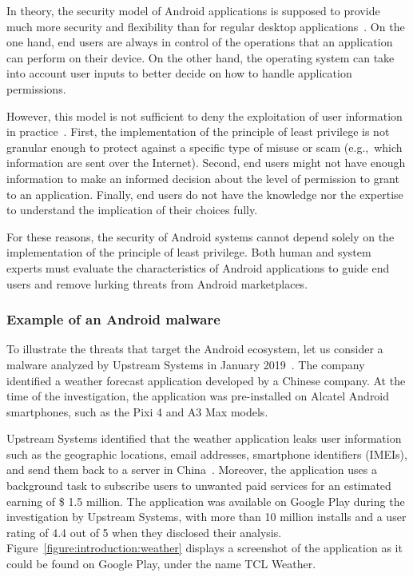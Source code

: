 In theory, the security model of Android applications is supposed to provide much more security and flexibility than for regular desktop applications~\cite{google_permissions_2019}.
On the one hand, end users are always in control of the operations that an application can perform on their device.
On the other hand, the operating system can take into account user inputs to better decide on how to handle application permissions.

However, this model is not sufficient to deny the exploitation of user information in practice~\cite{google_android_2018}.
First, the implementation of the principle of least privilege is not granular enough to protect against a specific type of misuse or scam (e.g.,\ which information are sent over the Internet).
Second, end users might not have enough information to make an informed decision about the level of permission to grant to an application.
Finally, end users do not have the knowledge nor the expertise to understand the implication of their choices fully.

For these reasons, the security of Android systems cannot depend solely on the implementation of the principle of least privilege.
Both human and system experts must evaluate the characteristics of Android applications to guide end users and remove lurking threats from Android marketplaces.
\subsubsection{Example of an Android malware}
To illustrate the threats that target the Android ecosystem, let us consider a malware analyzed by Upstream Systems in January 2019~\cite{upstream_systems_secure-d_2019}.
The company identified a weather forecast application developed by a Chinese company.
At the time of the investigation, the application was pre-installed on Alcatel Android smartphones, such as the Pixi 4 and A3 Max models.

Upstream Systems identified that the weather application leaks user information such as the geographic locations, email addresses, smartphone identifiers (IMEIs), and send them back to a server in China~\cite{upstream_systems_secure-d_2019}.
Moreover, the application uses a background task to subscribe users to unwanted paid services for an estimated earning of \$ 1.5 million.
The application was available on Google Play during the investigation by Upstream Systems, with more than 10 million installs and a user rating of 4.4 out of 5 when they disclosed their analysis.
Figure~\ref{figure:introduction:weather} displays a screenshot of the application as it could be found on Google Play, under the name TCL Weather.

